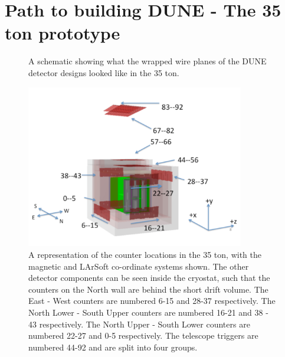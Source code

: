 \section{Path to building DUNE - The 35 ton prototype} \label{sec:The35tonDetector}  %

\begin{figure}[h!]
  \centering
  \caption[The wrapped wires of the 35 ton]{A schematic showing what the wrapped wire planes of the DUNE detector designs looked like in the 35 ton.}
  \label{fig:35tonWireGeom}
\end{figure}

\begin{figure}[h!]
  \centering
  \includegraphics[width=0.85\textwidth]{35tonFullDetect}
  \caption[A representation of the counter locations in the 35 ton]
          {A representation of the counter locations in the 35 ton, with the magnetic and LArSoft co-ordinate systems shown. The other detector components can be seen inside the cryostat, such that the counters on the North wall are behind the short drift volume. The East - West counters are numbered 6-15 and 28-37 respectively. The North Lower - South Upper counters are numbered 16-21 and 38 - 43 respectively. The North Upper - South Lower counters are numbered 22-27 and 0-5 respectively. The telescope triggers are numbered 44-92 and are split into four groups.}
  \label{fig:35tonCounterLoc}
\end{figure}

